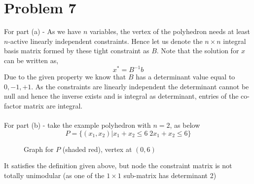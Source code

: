 \documentclass{article}
\numberwithin{equation}{section}
\begin{document}
\section{Problem 7} %
For part (a) - As we have $n$ variables, the vertex of the polyhedron needs at least $n$-active linearly independent constraints. Hence let us denote the $n\times n$ integral basis matrix formed by these tight constraint as $B$. Note that the solution for $x$ can be written as, 
\begin{equation}
    x^* = B^{-1}b
\end{equation}
Due to the given property we know that $B$ has a determinant value equal to $0, -1, +1$. As the constraints are linearly independent the determinant cannot be null and hence the inverse exists and is integral as determinant, entries of the co-factor matrix are integral.\\\\
For part (b) - take the example polyhedron with $n=2$, as below
\begin{equation}
    P = \{(x_1, x_2) | x_1 + x_2 \le 6 \; 2x_1+x_2 \le 6\}
\end{equation}
\begin{figure}[H]
    \centering
    \caption{Graph for $P$ (shaded red), vertex at $(0, 6)$}
    \label{fig:enter-label}
\end{figure}
\noindent It satisfies the definition given above, but node the constraint matrix is not totally unimodular (as one of the $1\times 1$ sub-matrix has determinant 2)
\newpage
\end{document}
